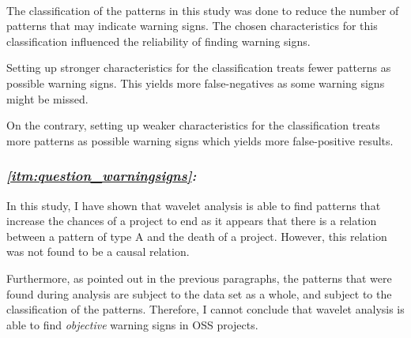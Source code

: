 \paragraph{}
The classification of the patterns in this study was done to reduce the
number of patterns that may indicate warning signs. The chosen characteristics
for this classification influenced the reliability of finding warning signs.

Setting up stronger characteristics for the classification treats fewer
patterns as possible warning signs. This yields more false-negatives as some
warning signs might be missed.

On the contrary, setting up weaker characteristics for the classification treats
more patterns as possible warning signs which yields more false-positive
results.

\subsubsection{\textit{\ref{itm:question_warningsigns}: \researchQuestion}}
In this study, I have shown that wavelet analysis is able to find patterns that
increase the chances of a project to end as it appears that there is a relation
between a pattern of type A and the death of a project. However, this relation
was not found to be a causal relation.

Furthermore, as pointed out in the previous paragraphs, the patterns that were
found during analysis are subject to the data set as a whole, and subject to
the classification of the patterns. Therefore, I cannot conclude that wavelet
analysis is able to find \textit{objective} warning signs in OSS projects.
